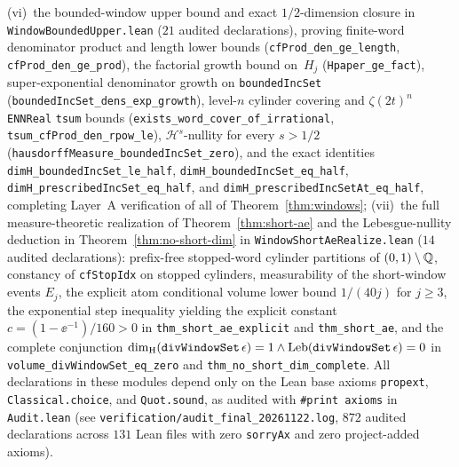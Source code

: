 \begin{remark}
(vi)~the bounded-window upper bound and exact $1/2$-dimension closure in \texttt{WindowBoundedUpper.lean} ($21$ audited declarations), proving finite-word denominator product and length lower bounds (\texttt{cfProd\_\allowbreak den\_\allowbreak ge\_\allowbreak length}, \texttt{cfProd\_\allowbreak den\_\allowbreak ge\_\allowbreak prod}), the factorial growth bound on~$H_j$ (\texttt{Hpaper\_\allowbreak ge\_\allowbreak fact}), super-exponential denominator growth on \texttt{boundedIncSet} (\texttt{boundedIncSet\_\allowbreak dens\_\allowbreak exp\_\allowbreak growth}), level-$n$ cylinder covering and $\zeta(2t)^n$ \texttt{ENNReal} \texttt{tsum} bounds (\texttt{exists\_\allowbreak word\_\allowbreak cover\_\allowbreak of\_\allowbreak irrational}, \texttt{tsum\_\allowbreak cfProd\_\allowbreak den\_\allowbreak rpow\_\allowbreak le}), $\mathcal H^s$-nullity for every $s>1/2$ (\texttt{hausdorffMeasure\_\allowbreak boundedIncSet\_\allowbreak zero}), and the exact identities \texttt{dimH\_\allowbreak boundedIncSet\_\allowbreak le\_\allowbreak half}, \texttt{dimH\_\allowbreak boundedIncSet\_\allowbreak eq\_\allowbreak half}, \texttt{dimH\_\allowbreak prescribedIncSet\_\allowbreak eq\_\allowbreak half}, and \texttt{dimH\_\allowbreak prescribedIncSetAt\_\allowbreak eq\_\allowbreak half}, completing Layer~A verification of all of Theorem~\ref{thm:windows};
(vii)~the full measure-theoretic realization of Theorem~\ref{thm:short-ae} and the Lebesgue-nullity deduction in Theorem~\ref{thm:no-short-dim} in \texttt{WindowShortAeRealize.lean} ($14$ audited declarations): prefix-free stopped-word cylinder partitions of $(0,1)\setminus\mathbb{Q}$, constancy of \texttt{cfStopIdx} on stopped cylinders, measurability of the short-window events $E_j$, the explicit atom conditional volume lower bound $1/(40j)$ for $j\ge3$, the exponential step inequality yielding the explicit constant $c=(1-\ee^{-1})/160>0$ in \texttt{thm\_\allowbreak short\_\allowbreak ae\_\allowbreak explicit} and \texttt{thm\_\allowbreak short\_\allowbreak ae}, and the complete conjunction $\dim_{\mathrm{H}}(\texttt{divWindowSet}\,\epsilon)=1\wedge\operatorname{Leb}(\texttt{divWindowSet}\,\epsilon)=0$ in \texttt{volume\_\allowbreak divWindowSet\_\allowbreak eq\_\allowbreak zero} and \texttt{thm\_\allowbreak no\_\allowbreak short\_\allowbreak dim\_\allowbreak complete}.
All declarations in these modules depend only on the Lean base axioms \texttt{propext}, \texttt{Classical.choice}, and \texttt{Quot.sound}, as audited with \texttt{\#print axioms} in \texttt{Audit.lean} (see \texttt{verification/\allowbreak audit\_\allowbreak final\_\allowbreak 20261122.log}, $872$ audited declarations across $131$ Lean files with zero \texttt{sorryAx} and zero project-added axioms).
\end{remark}

